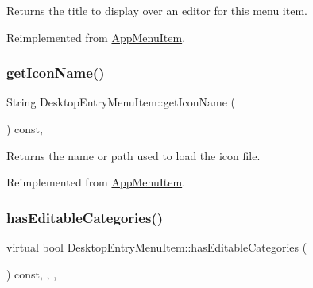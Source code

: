 \begin{DoxyReturn}{Returns}
the title to display over an editor for this menu item. 
\end{DoxyReturn}


Reimplemented from \mbox{\hyperlink{classAppMenuItem_a4f0501780311afb7630d99b9e84a5c9d}{App\+Menu\+Item}}.

\mbox{\label{classDesktopEntryMenuItem_ad65fc5b9d5d94280ab02708cedbf742c}} 
\subsubsection{\texorpdfstring{get\+Icon\+Name()}{getIconName()}}
{\footnotesize\ttfamily String Desktop\+Entry\+Menu\+Item\+::get\+Icon\+Name (\begin{DoxyParamCaption}{ }\end{DoxyParamCaption}) const\hspace{0.3cm}{\ttfamily [override]}, {\ttfamily [virtual]}}

\begin{DoxyReturn}{Returns}
the name or path used to load the icon file. 
\end{DoxyReturn}


Reimplemented from \mbox{\hyperlink{classAppMenuItem_a7c5b3d84b4fa24009e0618e0e3cd804e}{App\+Menu\+Item}}.

\mbox{\label{classDesktopEntryMenuItem_a6fcceaef6c50610d94fdec1f3f6e4dd5}} 
\subsubsection{\texorpdfstring{has\+Editable\+Categories()}{hasEditableCategories()}}
{\footnotesize\ttfamily virtual bool Desktop\+Entry\+Menu\+Item\+::has\+Editable\+Categories (\begin{DoxyParamCaption}{ }\end{DoxyParamCaption}) const\hspace{0.3cm}{\ttfamily [inline]}, {\ttfamily [override]}, {\ttfamily [protected]}, {\ttfamily [virtual]}}

